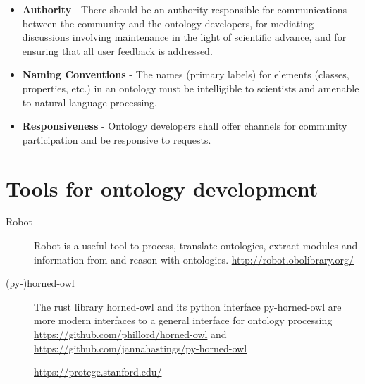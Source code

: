 \begin{itemize}
    \item \textbf{Authority} - There should be an authority responsible for communications between the community and the ontology developers, for mediating discussions involving maintenance in the light of scientific advance, and for ensuring that all user feedback is addressed.
    \item \textbf{Naming Conventions} - The names (primary labels) for elements (classes, properties, etc.) in an ontology must be intelligible to scientists and amenable to natural language processing.
    \item \textbf{Responsiveness} - Ontology developers shall offer channels for community participation and be responsive to requests.
\end{itemize}

\section{Tools for ontology development}

\begin{description}
    \item[Robot] Robot is a useful tool to process, translate ontologies, extract modules and information from and reason with ontologies. \url{http://robot.obolibrary.org/}
    \item[(py-)horned-owl] The rust library horned-owl and its python interface py-horned-owl are more modern interfaces to a general interface for ontology processing \url{https://github.com/phillord/horned-owl} and \url{https://github.com/jannahastings/py-horned-owl}
    \item[{\protege}] \url{https://protege.stanford.edu/}
\end{description}


%



